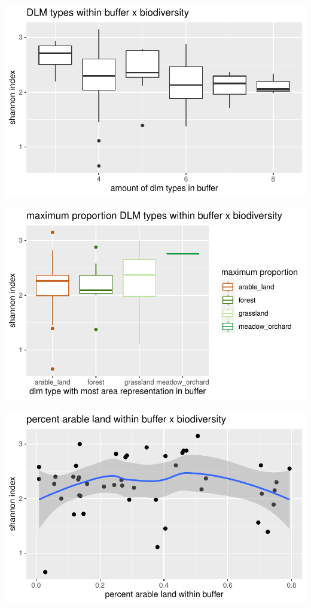 \documentclass[
  letterpaper,
  DIV=11,
  numbers=noendperiod]{scrartcl}
\begin{document}
\includegraphics{Landscape_Indices_files/figure-pdf/unnamed-chunk-17-2.pdf}

\includegraphics{Landscape_Indices_files/figure-pdf/unnamed-chunk-17-3.pdf}

\includegraphics{Landscape_Indices_files/figure-pdf/unnamed-chunk-17-4.pdf}
\end{document}
